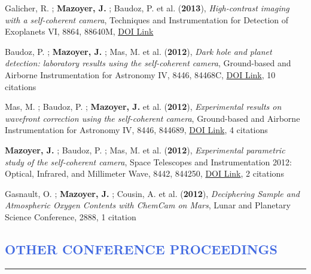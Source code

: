 \documentclass[11pt]{article}
\begin{document}
\begin{etaremune}
 \item Galicher, R. ; {\bf Mazoyer, J.} ; Baudoz, P. et al. ({\bf2013}), {\it High-contrast imaging with a self-coherent camera}, Techniques and Instrumentation for Detection of Exoplanets VI, 8864, 88640M, \href{https://doi.org/10.1117/12.2025298}{DOI Link}

 \item Baudoz, P. ; {\bf Mazoyer, J.} ; Mas, M. et al. ({\bf2012}), {\it Dark hole and planet detection: laboratory results using the self-coherent camera}, Ground-based and Airborne Instrumentation for Astronomy IV, 8446, 84468C, \href{https://doi.org/10.1117/12.926575}{DOI Link}, 10 citations

 \item Mas, M. ; Baudoz, P. ; {\bf Mazoyer, J.} et al. ({\bf2012}), {\it Experimental results on wavefront correction using the self-coherent camera}, Ground-based and Airborne Instrumentation for Astronomy IV, 8446, 844689, \href{https://doi.org/10.1117/12.926586}{DOI Link}, 4 citations

 \item {\bf Mazoyer, J.} ; Baudoz, P. ; Mas, M. et al. ({\bf2012}), {\it Experimental parametric study of the self-coherent camera}, Space Telescopes and Instrumentation 2012: Optical, Infrared, and Millimeter Wave, 8442, 844250, \href{https://doi.org/10.1117/12.926080}{DOI Link}, 2 citations

 \item Gasnault, O. ; {\bf Mazoyer, J.} ; Cousin, A. et al. ({\bf2012}), {\it Deciphering Sample and Atmospheric Oxygen Contents with ChemCam on Mars}, Lunar and Planetary Science Conference, 2888, 1 citation

 \end{etaremune}



\vspace{-0.5cm}
\textcolor{RoyalBlue}{\section{OTHER CONFERENCE PROCEEDINGS}
\vspace{-0.25cm}\hrule}
\vspace{0.6cm}
\end{document}
